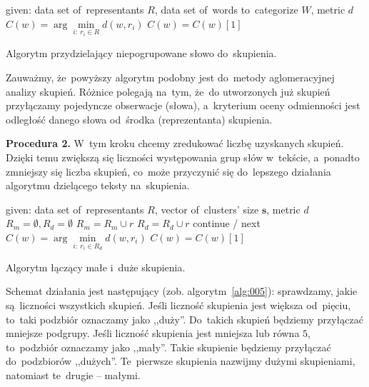 \documentclass{praca1}
\begin{document}
\begin{algorithm}[h!]
\begin{algorithmic}[1]
		\State given: data set of~representants $R$, data set of~words to~categorize $W$, metric $d$
            \State $C(w) = \arg \min\limits_{i:\ r_i \in R} d(w,r_i)$
            	\State $C(w) = C(w)[1]$
            \EndIf
       \EndFor
\end{algorithmic}
\caption{Algorytm przydzielający niepogrupowane słowo do~skupienia.}\label{alg:004}
\end{algorithm}

Zauważmy, że~powyższy algorytm podobny jest do~metody aglomeracyjnej analizy skupień. Różnice polegają na~tym, że~do utworzonych już skupień przyłączamy pojedyncze obserwacje (słowa), a~kryterium oceny odmienności jest odległość danego słowa od~środka (reprezentanta) skupienia.

\textbf{Procedura 2.} W~tym kroku chcemy zredukować liczbę uzyskanych skupień. Dzięki temu zwiększą się liczności występowania grup słów w~tekście, a~ponadto zmniejszy się liczba skupień, co~może przyczynić się do~lepszego działania algorytmu dzielącego teksty na~skupienia.

\begin{algorithm}[h!]
\begin{algorithmic}[1]
		\State given: data set of~representants $R$, vector of~clusters' size $\mathbf{s}$, metric $d$
		\State $R_m = \emptyset, R_d = \emptyset$
				\State $R_m = R_m \cup r$
			\Else
				\State $R_d = R_d \cup r$
			\EndIf
		\EndFor
        		\State continue / next
        	\EndIf
            \State $C(w) = \arg\min\limits_{i:\ r_i \in R_d} d(w,r_i)$
            	\State $C(w) = C(w)[1]$
            \EndIf
       \EndFor
\end{algorithmic}
\caption{Algorytm łączący małe i~duże skupienia.}\label{alg:005}
\end{algorithm}

Schemat działania jest następujący (zob. algorytm~\ref{alg:005}): sprawdzamy, jakie są~liczności wszystkich skupień. Jeśli liczność skupienia jest większa od~pięciu, to~taki podzbiór oznaczamy jako ,,duży''. Do~takich skupień będziemy przyłączać mniejsze podgrupy. Jeśli liczność skupienia jest mniejsza lub równa $5$, to~podzbiór oznaczamy jako ,,mały''. Takie skupienie będziemy przyłączać do~podzbiorów ,,dużych''. Te~pierwsze skupienia nazwijmy dużymi skupieniami, natomiast te~drugie -- małymi. 
\end{document}
